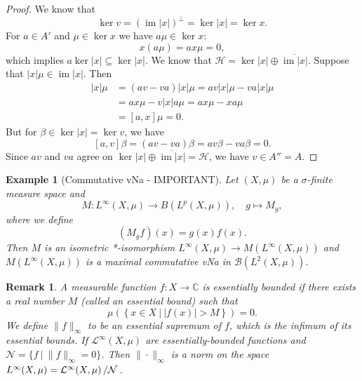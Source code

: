 \documentclass[10pt, a4paper]{article}
\newtheorem*{remark}{Remark}
\newtheorem{example}[thm]{Example}
\newenvironment{noticeC}{%
  \tcolorbox[%
  notitle,
  empty,
  enhanced,  %
  breakable,
  coltext=black, 
  fontupper=\rmfamily,
  noparskip,
  sharp corners,
  boxrule=-1pt,  %
  frame hidden,
  left=7pt,  %
  right=7pt,
  top=5pt,
  bottom=5pt,
  before skip=2.5ex plus 2pt,
  after skip=2.5ex plus 2pt,
  overlay unbroken and last={%
  },
  ]}
{\endtcolorbox}
\newenvironment{myproof}%
  {\begin{noticeC}\begin{proof}}%
  {\end{proof}\end{noticeC}}
\newcommand{\C}{\mathbb {C}}
\newcommand{\quot}[2]{{\raisebox{0em}{$#1$}\left/\raisebox{0em}{$#2$}\right.}}
\DeclareMathOperator{\im}{im}
\begin{document}
\begin{myproof}
  We know that 
  $$\ker v = (\im |x|)^\perp = \ker |x| = \ker x.$$
  For $a \in A'$ and $\mu \in \ker x$ we have $a\mu \in \ker x$:
  $$x (a\mu) = a x\mu = 0,$$
  which implies $a \ker |x| \subseteq \ker |x|$.
  We know that $\mathcal{H} = \ker |x| \oplus \overline{\im |x|}$.
  Suppose that $|x| \mu \in \im |x|$. Then 
  \begin{align*}
    [a, v] |x| \mu &= (av - va) |x| \mu = av |x| \mu - va |x| \mu\\
    &= ax\mu - v|x| a \mu = ax\mu - xa\mu \\
    &= [a, x]\mu = 0.
  \end{align*}
  But for $\beta \in \ker |x| = \ker v$, we have
  $$[a, v] \beta = (av - va)\beta = av\beta - va \beta = 0.$$
  Since $av$ and $va$ agree on $\ker |x| \oplus \overline{\im |x|}= \mathcal{H}$, we have $v \in A'' = A$.
\end{myproof}

\begin{example}[Commutative vNa - IMPORTANT] \label{ex:1}
  Let $(X, \mu)$  be a $\sigma$-finite measure space and 
  $$M: L^\infty (X, \mu) \to B (L^p (X,\mu)),\quad g \mapsto M_g,$$
  where we define 
  $$(M_g f) (x) = g (x) f(x).$$
  Then $M$ is an isometric *-isomorphism $L^\infty (X, \mu) \to M(L^\infty (X, \mu))$
  and $M(L^\infty (X, \mu))$ is a maximal commutative vNa in $\mathcal{B} (L^2 (X, \mu))$.
\end{example}

\begin{remark}
  A measurable function $f: X \to \C$ is essentially bounded if there exists a real number $M$ (called an essential bound) such that 
  $$\mu \left(\left\lbrace x \in X\ |\ |f(x)| > M \right\rbrace\right) = 0.$$
  We define $\| f\|_{\infty}$ to be an essential supremum of $f$, which is the infimum of its essential bounds.
  If $\mathcal{L}^\infty (X, \mu)$ are essentially-bounded functions and $\mathcal{N} = \{f\ |\ \| f\|_\infty  = 0\}$.
  Then $\| \cdot \|_{\infty}$ is a norm on the space $L^\infty (X, \mu) = \quot{\mathcal{L}^\infty (X, \mu)}{\mathcal{N}}$.
\end{remark}
\end{document}
